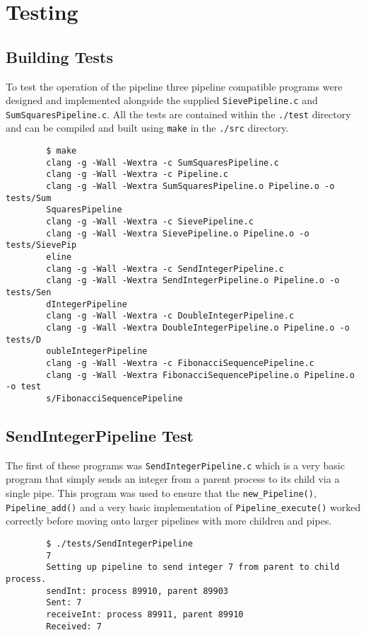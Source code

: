 \documentclass{article}
\begin{document}
    \section{Testing}
    \subsection{Building Tests}
    To test the operation of the pipeline three pipeline compatible programs were designed and implemented alongside the supplied \verb+SievePipeline.c+ and \verb+SumSquaresPipeline.c+.
    All the tests are contained within the \verb+./test+ directory and can be compiled and built using \verb+make+ in the \verb+./src+ directory.

        \begin{verbatim}
        $ make
        clang -g -Wall -Wextra -c SumSquaresPipeline.c
        clang -g -Wall -Wextra -c Pipeline.c
        clang -g -Wall -Wextra SumSquaresPipeline.o Pipeline.o -o tests/Sum
        SquaresPipeline
        clang -g -Wall -Wextra -c SievePipeline.c
        clang -g -Wall -Wextra SievePipeline.o Pipeline.o -o tests/SievePip
        eline
        clang -g -Wall -Wextra -c SendIntegerPipeline.c
        clang -g -Wall -Wextra SendIntegerPipeline.o Pipeline.o -o tests/Sen
        dIntegerPipeline
        clang -g -Wall -Wextra -c DoubleIntegerPipeline.c
        clang -g -Wall -Wextra DoubleIntegerPipeline.o Pipeline.o -o tests/D
        oubleIntegerPipeline
        clang -g -Wall -Wextra -c FibonacciSequencePipeline.c
        clang -g -Wall -Wextra FibonacciSequencePipeline.o Pipeline.o -o test
        s/FibonacciSequencePipeline
        \end{verbatim}

    \subsection{SendIntegerPipeline Test}
    \noindent The first of these programs was \verb+SendIntegerPipeline.c+ which is a very basic program that simply sends an integer from a parent process to its child via a single pipe.
    This program was used to ensure that the \verb+new_Pipeline()+, \verb+Pipeline_add()+ and a very basic implementation of \verb+Pipeline_execute()+ worked correctly before moving onto larger pipelines with more children and pipes.

        \begin{verbatim}
        $ ./tests/SendIntegerPipeline
        7
        Setting up pipeline to send integer 7 from parent to child process.
        sendInt: process 89910, parent 89903
        Sent: 7
        receiveInt: process 89911, parent 89910
        Received: 7
        \end{verbatim}
\end{document}
